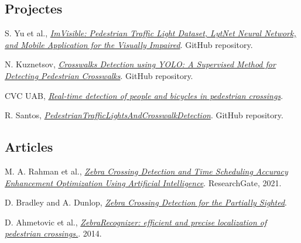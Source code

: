 \documentclass[10pt,a4paper,twocolumn,twoside]{article}
\begin{document}


\begin{thebibliography}{9}
	
	\subsection*{Projectes}
	S. Yu et al., \textit{\href{https://github.com/samuelyu2002/ImVisible}{ImVisible: Pedestrian Traffic Light Dataset, LytNet Neural Network, and Mobile Application for the Visually Impaired}}. GitHub repository.
	
	N. Kuznetsov, \textit{\href{https://github.com/xN1ckuz/Crosswalks-Detection-using-YOLO}{Crosswalks Detection using YOLO: A Supervised Method for Detecting Pedestrian Crosswalks}}. GitHub repository.
	
	CVC UAB, \textit{\href{https://www.cvc.uab.es/portfolio/?page_id=3872}{Real-time detection of people and bicycles in pedestrian crossings}}.
	
	R. Santos, \textit{\href{https://github.com/ronaldosm/PedestrianTrafficLightsAndCrosswalkDetection}{PedestrianTrafficLightsAndCrosswalkDetection}}. GitHub repository.
	
	\subsection*{Articles}
	M. A. Rahman et al., \textit{\href{https://www.researchgate.net/publication/354299232_Zebra_Crossing_Detection_and_Time_Scheduling_Accuracy_Enhancement_Optimization_Using_Artificial_Intelligence}{Zebra Crossing Detection and Time Scheduling Accuracy Enhancement Optimization Using Artificial Intelligence}}. ResearchGate, 2021.
	
	D. Bradley and A. Dunlop, \textit{\href{https://scispace.com/pdf/zebra-crossing-detection-for-the-partially-sighted-22q9n427id.pdf}{Zebra Crossing Detection for the Partially Sighted}}.
	
	D. Ahmetovic et al., \textit{\href{https://dragan.ahmetovic.it/pdf/ahmetovic2014zebrarecognizer.pdf}{ZebraRecognizer: efficient and precise localization of pedestrian crossings.}}. 2014.
	

\end{thebibliography}
\end{document}
